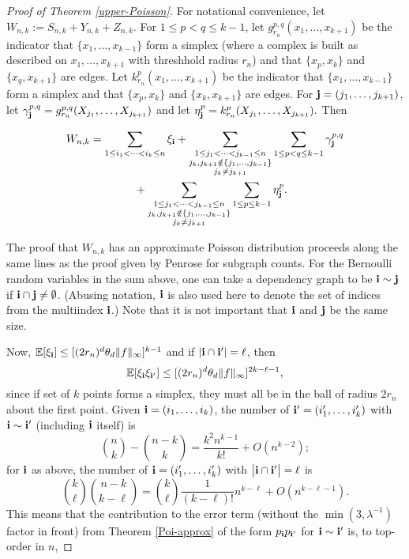 \documentclass{amsart}
\theoremstyle{definition}
\newcommand{\E}{\mathbb{E}}
\renewcommand{\1}{\mathbb{1}}
\begin{document}
\begin{proof}[Proof of Theorem \ref{upper-Poisson}]
For notational convenience, let $W_{n,k}:=S_{n,k}+Y_{n,k}+Z_{n,k}$.
  For $1\le
  p<q\le k-1$, let $g^{p,q}_{r_n}(x_1,\ldots,x_{k+1})$ be the
  indicator that $\{x_1,\ldots,x_{k-1}\}$ form a simplex (where a
  complex is built as described on $x_1,\ldots,x_{k+1}$ with
  threshhold radius $r_n$) and that $\{x_p,x_k\}$ and
  $\{x_q,x_{k+1}\}$ are edges.  Let $k^{p}_{r_n}(x_1,\ldots,x_{k+1})$
  be the indicator that $\{x_1,\ldots,x_{k-1}\}$ form a simplex and
  that $\{x_p,x_k\}$ and $\{x_k,x_{k+1}\}$ are edges.  For ${\bf j}=
  (j_1,\ldots,j_{k+1})$, let $\gamma^{p,q}_{\bf
    j}=g^{p,q}_{r_n}(X_{j_1}, \ldots,X_{j_{k+1}})$ and let
  $\eta^p_{\bf j}=k^p_{r_n}(X_{j_1},\ldots,X_{j_{k+1}}).$ Then

  \begin{align*}
W_{n,k}&=\sum_{1\le i_1<\cdots<i_k\le n}\xi_{\bf i}
   +\sum_{\substack{
    1\le j_1<\cdots<j_{k-1}\le
    n\\j_k,j_{k+1}\notin\{j_1,\ldots,j_{k-1}\}\\j_k\neq j_{k+1}}}\sum_{1\le p<q\le
k-1}\gamma^{p,q}_{\bf j}\\
& \qquad\qquad+\sum_{\substack{
  1\le j_1<\cdots<j_{k-1}\le
  n\\j_k,j_{k+1}\notin\{j_1,\ldots,j_{k-1}\}\\j_k\neq j_{k+1}}}\sum_{1\le p\le
k-1}\eta^{p}_{\bf j}.
\end{align*}

 The proof that $W_{n,k}$ has an approximate Poisson distribution
proceeds along the same lines as the proof given by Penrose for subgraph
counts.  For the
Bernoulli random variables in the sum above, one can take a dependency
graph to be ${\bf i}\sim{\bf j}$ if ${\bf i}\cap{\bf j}\neq\emptyset$.
(Abusing notation, ${\bf i}$ is also used here to denote the set of
indices from the multiindex ${\bf i}$.)  Note that it is not important
that ${\bf i}$ and ${\bf j}$ be the same size.

Now, $\E[\xi_{\bf i}]\le [(2r_n)^d\theta_d\|f\|_\infty]^{k-1}$
and if $|{\bf i}\cap{\bf i'}|=\ell$, 
then $$\E[\xi_{\bf i}\xi_{\bf i'}]\le [(2r_n)^d\theta_d\|f\|_\infty]^{2k-\ell-1},$$ 
 since if set of $k$ points forms a simplex, they must
all be in the ball of radius $2r_n$ about the first point.  
Given ${\bf i}=(i_1,\ldots,i_k)$, the number of ${\bf i'}=(i_1',\ldots,
i_k')$ with ${\bf i}\sim
{\bf i'}$ (including ${\bf i}$ itself) is 
\begin{equation*}
\binom{n}{k}-\binom{n-k}{k}=\frac{k^2n^{k-1}}{k!}+O\left(n^{k-2}\right);
\end{equation*} 
for ${\bf i}$ as above, the number of ${\bf i}=(i_1',\ldots,i_k')$ with 
$\big|{\bf i}\cap{\bf i'}\big|=\ell$ is
 \begin{equation*}
\binom{k}{\ell}\binom{n-k}{k-\ell}=\binom{k}{\ell}\frac{1}{(k-\ell)!}n^{k-\ell}+
O\left(n^{k-\ell-1}\right).
\end{equation*}
This means that the contribution to the error term (without the $\min(3,
\lambda^{-1})$ factor in front) from Theorem \ref{Poi-approx} of the form
$p_{\bf i}p_{\bf i'}$ for ${\bf i}\sim{\bf i'}$ is, to top-order in $n$,


\end{proof}
\end{document}
